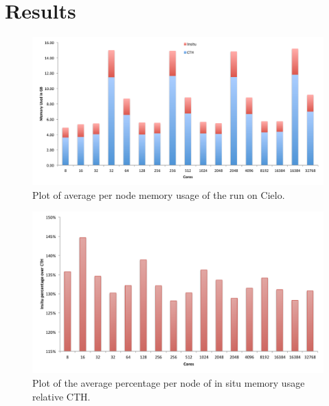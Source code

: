 \section{Results}
\label{sec:Results}


\begin{figure}[htb]
  \centering
  \includegraphics[width=\linewidth]{figures/MemoryUsagePerNode.pdf}
  \caption{Plot of average per node memory usage of the run on Cielo.}
  \label{fig:MemoryPerNode}
\end{figure}

\begin{figure}[htb]
  \centering
  \includegraphics[width=\linewidth]{figures/MemoryUsagePercent.pdf}
  \caption{Plot of the average percentage per node of in situ memory usage relative CTH.}
  \label{fig:MemoryTotal}
\end{figure}
